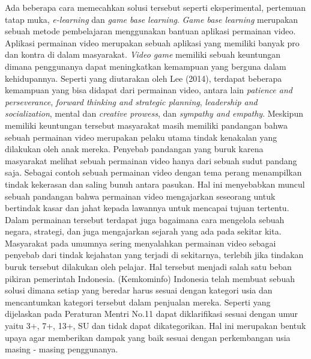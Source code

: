 \linebreak\linebreak
Ada beberapa cara memecahkan solusi tersebut seperti eksperimental, pertemuan tatap muka, \textit{e-learning} dan \textit{game base learning}. \textit{Game base learning} merupakan sebuah metode pembelajaran menggunakan bantuan aplikasi permainan video. Aplikasi permainan video merupakan sebuah aplikasi yang memiliki banyak pro dan kontra di dalam masyarakat. \textit{Video game} memiliki sebuah keuntungan dimana penggunanya dapat meningkatkan kemampuan yang berguna dalam kehidupannya. Seperti yang diutarakan oleh Lee (2014), terdapat beberapa kemampuan yang bisa didapat dari permainan video, antara lain \textit{patience and perseverance}, \textit{forward thinking and strategic planning}, \textit{leadership and socialization}, mental dan \textit{creative prowess}, dan \textit{sympathy and empathy}. Meskipun memiliki keuntungan tersebut masyarakat masih memiliki pandangan bahwa sebuah permainan video merupakan pelaku utama tindak kenakalan yang dilakukan oleh anak mereka.
\linebreak\linebreak
Penyebab pandangan yang buruk karena masyarakat melihat sebuah permainan video hanya dari sebuah sudut pandang saja. Sebagai contoh sebuah permainan video dengan tema perang menampilkan tindak kekerasan dan saling bunuh antara pasukan. Hal ini menyebabkan muncul sebuah pandangan bahwa permainan video mengajarkan seseorang untuk bertindak kasar dan jahat kepada lawannya untuk mencapai tujuan tertentu. Dalam permainan tersebut terdapat juga bagaimana cara mengelola sebuah negara, strategi, dan juga mengajarkan sejarah yang ada pada sekitar kita. Masyarakat pada umumnya sering menyalahkan permainan video sebagai penyebab dari tindak kejahatan yang terjadi di sekitarnya, terlebih jika tindakan buruk tersebut dilakukan oleh pelajar.
\linebreak\linebreak
Hal tersebut menjadi salah satu beban pikiran pemerintah Indonesia. \kemkominfo (Kemkominfo) Indonesia telah membuat sebuah solusi dimana setiap \game yang beredar harus sesuai dengan kategori usia dan mencantumkan kategori tersebut dalam penjualan \game mereka. Seperti yang dijelaskan pada Peraturan Mentri No.11 \game dapat diklarifikasi sesuai dengan umur yaitu 3+, 7+, 13+, SU dan tidak dapat dikategorikan. Hal ini merupakan bentuk upaya agar \game memberikan dampak yang baik sesuai dengan perkembangan usia masing - masing penggunanya.
\linebreak\linebreak
